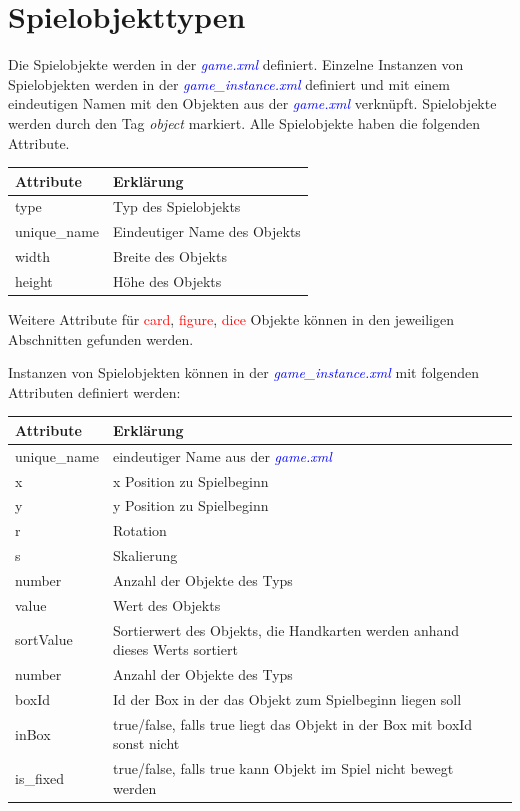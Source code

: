 \documentclass[ngerman]{scrbook}
\newcommand{\gamefile}[1]{\textit{\textcolor{blue}{#1}}\xspace}
\newcommand{\game}{\gamefile{game.xml}}
\newcommand{\gameinstance}{\gamefile{game\_instance.xml}}
\newcommand{\card}{\textcolor{red}{card}\xspace}
\newcommand{\gamefigure}{\textcolor{red}{figure}\xspace}
\newcommand{\dice}{\textcolor{red}{dice}\xspace}
\begin{document}
	\section{Spielobjekttypen}
	
	Die Spielobjekte werden in der \game definiert. Einzelne Instanzen von Spielobjekten werden in der \gameinstance definiert und mit einem eindeutigen Namen mit den Objekten aus der \game verknüpft. Spielobjekte werden durch den Tag \textit{object} markiert. Alle Spielobjekte haben die folgenden Attribute.
	
	\begin{table}[!h]
		\renewcommand{\arraystretch}{1.5}
		\begin{tabularx}{\textwidth}{XX}
			Attribute & Erklärung\\\hline
			type & Typ des Spielobjekts\\
			unique\_name & Eindeutiger Name des Objekts\\
			width & Breite des Objekts\\
			height & Höhe des Objekts\\
		\end{tabularx}
	\end{table}

	Weitere Attribute für \card, \gamefigure, \dice Objekte können in den jeweiligen Abschnitten gefunden werden.

	Instanzen von Spielobjekten können in der \gameinstance mit folgenden Attributen definiert werden:
	
	\begin{table}[!h]
		\renewcommand{\arraystretch}{1.5}		\begin{tabularx}{\textwidth}{XXX}
			Attribute & Erklärung\\\hline
			unique\_name & eindeutiger Name aus der \game\\
			x & x Position zu Spielbeginn\\
			y & y Position zu Spielbeginn\\
			r & Rotation\\
			s & Skalierung\\
			number & Anzahl der Objekte des Typs\\
			value & Wert des Objekts\\
			sortValue & Sortierwert des Objekts, die Handkarten werden anhand dieses Werts sortiert\\
			number & Anzahl der Objekte des Typs\\
			boxId & Id der Box in der das Objekt zum Spielbeginn liegen soll\\
			inBox & true/false, falls true liegt das Objekt in der Box mit boxId sonst nicht\\
			is\_fixed & true/false, falls true kann Objekt im Spiel nicht bewegt werden\\
		\end{tabularx}
	\end{table}
\end{document}
